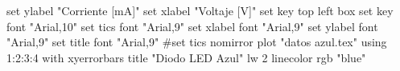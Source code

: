 set ylabel "Corriente [mA]"
set xlabel "Voltaje [V]"
set key top left box
set key font "Arial,10"
set tics font "Arial,9"
set xlabel font "Arial,9"
set ylabel font "Arial,9"
set title font "Arial,9"
#set tics nomirror
plot "datos azul.tex" using 1:2:3:4 with xyerrorbars title "Diodo LED Azul" lw 2 linecolor rgb "blue"


